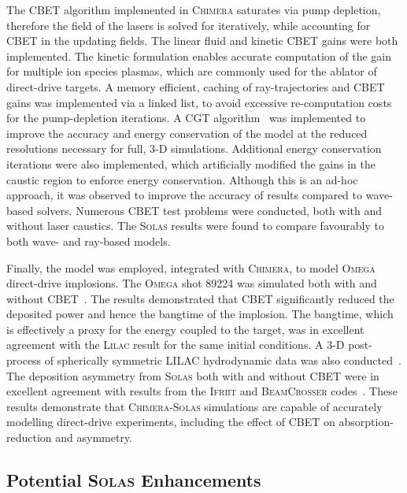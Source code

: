 The \ac{CBET} algorithm implemented in \textsc{Chimera} saturates via pump depletion, therefore the field of the lasers is solved for iteratively, while accounting for \ac{CBET} in the updating fields.
The linear fluid and kinetic \ac{CBET} gains were both implemented.
The kinetic formulation enables accurate computation of the gain for multiple ion species plasmas, which are commonly used for the ablator of direct-drive targets.
A memory efficient, caching of ray-trajectories and \ac{CBET} gains was implemented via a linked list, to avoid excessive re-computation costs for the pump-depletion iterations.
A \ac{CGT} algorithm~\cite{follett_raybased_2018} was implemented to improve the accuracy and energy conservation of the model at the reduced resolutions necessary for full, 3-D simulations.
Additional energy conservation iterations were also implemented, which artificially modified the gains in the caustic region to enforce energy conservation.
Although this is an ad-hoc approach, it was observed to improve the accuracy of results compared to wave-based solvers.
Numerous \ac{CBET} test problems were conducted, both with and without laser caustics.
The \textsc{Solas} results were found to compare favourably to both wave- and ray-based models.

Finally, the model was employed, integrated with \textsc{Chimera}, to model \textsc{Omega} direct-drive implosions.
The \textsc{Omega} shot 89224 was simulated both with and without \ac{CBET}~\cite{cao_interpreting_2019}.
The results demonstrated that \ac{CBET} significantly reduced the deposited power and hence the bangtime of the implosion.
The bangtime, which is effectively a proxy for the energy coupled to the target, was in excellent agreement with the \textsc{Lilac} result for the same initial conditions.
A 3-D post-process of spherically symmetric LILAC hydrodynamic data was also conducted~\cite{colaitis_inverse_2021}.
The deposition asymmetry from \textsc{Solas} both with and without \ac{CBET} were in excellent agreement with results from the \textsc{Ifriit} and \textsc{BeamCrosser} codes~\cite{colaitis_3d_2023a}.
These results demonstrate that \textsc{Chimera}-\textsc{Solas} simulations are capable of accurately modelling direct-drive experiments, including the effect of \ac{CBET} on absorption-reduction and asymmetry.

\subsection{Potential \textsc{Solas} Enhancements}

